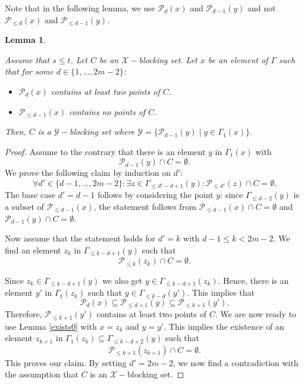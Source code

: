 \documentclass[12pt]{article}
\newcommand{\Points}{\mathcal{P}}
\newtheorem{lemma}{Lemma}
\theoremstyle{remark}
\begin{document}
Note that in the following lemma, we use \(\Points_d(x)\) and \(\Points_{d-1}(y)\) and not \(\Points_{\le d}(x)\) and \(\Points_{\le d-1}(y)\).
\begin{lemma}\label{traceLines}
	
	Assume that \(s\le t\). Let $C$ be an $\mathcal{X}-$blocking set.
	Let \(x\) be an element of \(\Gamma\) such that for some \(d\in\{1,\dots,2m-2\}\):
	\begin{itemize}
		\item \(\Points_d(x)\) contains at least two points of \(C\).
		\item \(\Points_{\le d-1}(x)\) contains no points of \(C\).
	\end{itemize}
Then, $C$ is a $\mathcal{Y}-$blocking set where $\mathcal{Y}=\{\Points_{d-1}(y)\mid y\in \Gamma_1(x)\}.$

    
\end{lemma}
\begin{proof}
	
	Assume to the contrary that there is an element \(y\) in \(\Gamma_{1}(x)\) with 
	\[\Points_{d-1}(y)\cap C = \emptyset.\]
	We prove the following claim by induction on \(d'\):
	\[\forall d' \in \{d-1,\dots,2m-2\}:\exists z \in \Gamma_{\le d'-d +1}(y): \Points_{\le d'}(z)\cap C = \emptyset.\]
	The base case \(d' = d-1\) follows by considering the point \(y\): since \(\Gamma_{\le d-2}(y)\) is a subset of \(\Points_{\le d-1}(x)\), the statement follows from \(\Points_{\le d-1}(x)\cap C = \emptyset\) and \(\Points_{d-1}(y)\cap C = \emptyset\).
	
	Now assume that the statement holds for \(d' = k\) with \(d-1\le k<2m-2\). 
	We find an element \(z_k\) in \(\Gamma_{\le k-d+1}(y)\) such that \[\Points_{\le k}(z_k)\cap C = \emptyset.\] 
	
	Since \(z_k\in \Gamma_{\le k-d+1}(y)\) we also get \(y \in \Gamma_{\le k-d+1}(z_k)\).
	Hence, there is an element \(y'\) in \(\Gamma_{1}(z_k)\) such that \(y \in \Gamma_{\le k-d}(y')\). This implies that \[\Points_d(x) \subseteq \Points_{\le d+1}(y) \subseteq \Points_{\le k+1}(y').\]
	Therefore, \(\Points_{\le k+1}(y')\) contains at least two points of \(C\).
	We are now ready to use Lemma \ref{exists0} with \(x=z_k\) and \(y=y'\). This implies the existence of an element \(z_{k+1}\) in \(\Gamma_1(z_k)\subseteq \Gamma_{\le k-d+2}(y)\) such that \[\Points_{\le k+1}(z_{k+1})\cap C = \emptyset.\]
	This proves our claim.
	By setting \(d'=2m-2\), we now find a contradiction with the assumption that $C$ is an $\mathcal{X}-$blocking set.
\end{proof}
\end{document}

